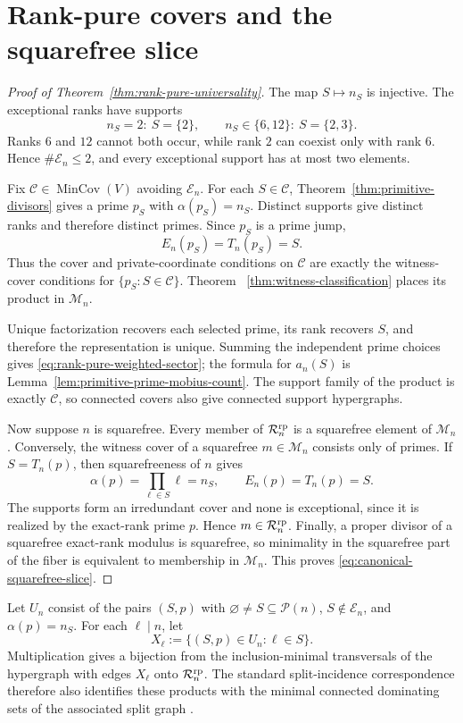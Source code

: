 \section{Rank-pure covers and the squarefree slice}\label{sec:rank-pure}

\begin{proof}[Proof of Theorem~\ref{thm:rank-pure-universality}]
The map $S\mapsto n_S$ is injective.  The exceptional ranks have supports
\[
 n_S=2:\ S=\{2\},\qquad
 n_S\in\{6,12\}:\ S=\{2,3\}.
\]
Ranks $6$ and $12$ cannot both occur, while rank $2$ can coexist only with
rank $6$.  Hence $\#\mathcal E_n\leq2$, and every exceptional support has at
most two elements.

Fix $\mathcal C\in\operatorname{MinCov}(V)$ avoiding $\mathcal E_n$.
For each $S\in\mathcal C$, Theorem~\ref{thm:primitive-divisors} gives a
prime $p_S$ with $\alpha(p_S)=n_S$.  Distinct supports give distinct ranks
and therefore distinct primes.  Since $p_S$ is a prime jump,
\[
 E_n(p_S)=T_n(p_S)=S.
\]
Thus the cover and private-coordinate conditions on $\mathcal C$ are exactly
the witness-cover conditions for $\{p_S:S\in\mathcal C\}$.  Theorem~
\ref{thm:witness-classification} places its product in $\mathcal M_n$.

Unique factorization recovers each selected prime, its rank recovers $S$, and
therefore the representation is unique.  Summing the independent prime
choices gives \eqref{eq:rank-pure-weighted-sector}; the formula for $a_n(S)$
is Lemma~\ref{lem:primitive-prime-mobius-count}.  The support family of the
product is exactly $\mathcal C$, so connected covers also give connected
support hypergraphs.

Now suppose $n$ is squarefree.  Every member of $\mathcal R_n^{\rm rp}$ is
a squarefree element of $\mathcal M_n$.  Conversely, the witness cover of a
squarefree $m\in\mathcal M_n$ consists only of primes.  If
$S=T_n(p)$, then squarefreeness of $n$ gives
\[
 \alpha(p)=\prod_{\ell\in S}\ell=n_S,
 \qquad E_n(p)=T_n(p)=S.
\]
The supports form an irredundant cover and none is exceptional, since it is
realized by the exact-rank prime $p$.  Hence $m\in\mathcal R_n^{\rm rp}$.
Finally, a proper divisor of a squarefree exact-rank modulus is squarefree,
so minimality in the squarefree part of the fiber is equivalent to membership
in $\mathcal M_n$.  This proves \eqref{eq:canonical-squarefree-slice}.
\end{proof}

\begin{corollary}
\label{cor:rank-pure-minimal-transversals}
Let $U_n$ consist of the pairs $(S,p)$ with
$\varnothing\ne S\subseteq\mathcal P(n)$, $S\notin\mathcal E_n$, and
$\alpha(p)=n_S$.  For each $\ell\mid n$, let
\[
 X_\ell:=\{(S,p)\in U_n:\ell\in S\}.
\]
Multiplication gives a bijection from the inclusion-minimal transversals of
the hypergraph with edges $X_\ell$ onto $\mathcal R_n^{\rm rp}$.  The
standard split-incidence correspondence therefore also identifies these
products with the minimal connected dominating sets of the associated split
graph \cite[Proposition~30]{KanteLimouzyMaryNourine2014DominatingSets}.
\end{corollary}

